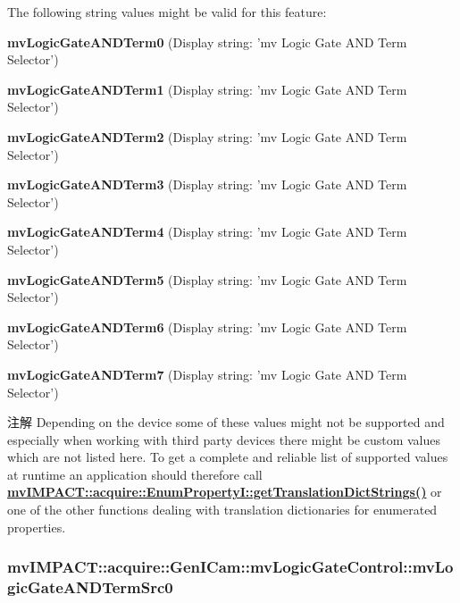 The following string values might be valid for this feature\+:
\begin{DoxyItemize}
\item {\bfseries mv\+Logic\+Gate\+A\+N\+D\+Term0} (Display string\+: 'mv Logic Gate A\+N\+D Term Selector')
\item {\bfseries mv\+Logic\+Gate\+A\+N\+D\+Term1} (Display string\+: 'mv Logic Gate A\+N\+D Term Selector')
\item {\bfseries mv\+Logic\+Gate\+A\+N\+D\+Term2} (Display string\+: 'mv Logic Gate A\+N\+D Term Selector')
\item {\bfseries mv\+Logic\+Gate\+A\+N\+D\+Term3} (Display string\+: 'mv Logic Gate A\+N\+D Term Selector')
\item {\bfseries mv\+Logic\+Gate\+A\+N\+D\+Term4} (Display string\+: 'mv Logic Gate A\+N\+D Term Selector')
\item {\bfseries mv\+Logic\+Gate\+A\+N\+D\+Term5} (Display string\+: 'mv Logic Gate A\+N\+D Term Selector')
\item {\bfseries mv\+Logic\+Gate\+A\+N\+D\+Term6} (Display string\+: 'mv Logic Gate A\+N\+D Term Selector')
\item {\bfseries mv\+Logic\+Gate\+A\+N\+D\+Term7} (Display string\+: 'mv Logic Gate A\+N\+D Term Selector')
\end{DoxyItemize}

\begin{DoxyNote}{注解}
Depending on the device some of these values might not be supported and especially when working with third party devices there might be custom values which are not listed here. To get a complete and reliable list of supported values at runtime an application should therefore call {\bfseries \hyperlink{classmv_i_m_p_a_c_t_1_1acquire_1_1_enum_property_i_a0ba6ccbf5ee69784d5d0b537924d26b6}{mv\+I\+M\+P\+A\+C\+T\+::acquire\+::\+Enum\+Property\+I\+::get\+Translation\+Dict\+Strings()}} or one of the other functions dealing with translation dictionaries for enumerated properties. 
\end{DoxyNote}
\hypertarget{classmv_i_m_p_a_c_t_1_1acquire_1_1_gen_i_cam_1_1mv_logic_gate_control_a71eefe30ae8aa7fc1f738becc8e5d529}{
\subsubsection[{mv\+Logic\+Gate\+A\+N\+D\+Term\+Src0}]{ mv\+I\+M\+P\+A\+C\+T\+::acquire\+::\+Gen\+I\+Cam\+::mv\+Logic\+Gate\+Control\+::mv\+Logic\+Gate\+A\+N\+D\+Term\+Src0}}\label{classmv_i_m_p_a_c_t_1_1acquire_1_1_gen_i_cam_1_1mv_logic_gate_control_a71eefe30ae8aa7fc1f738becc8e5d529}


